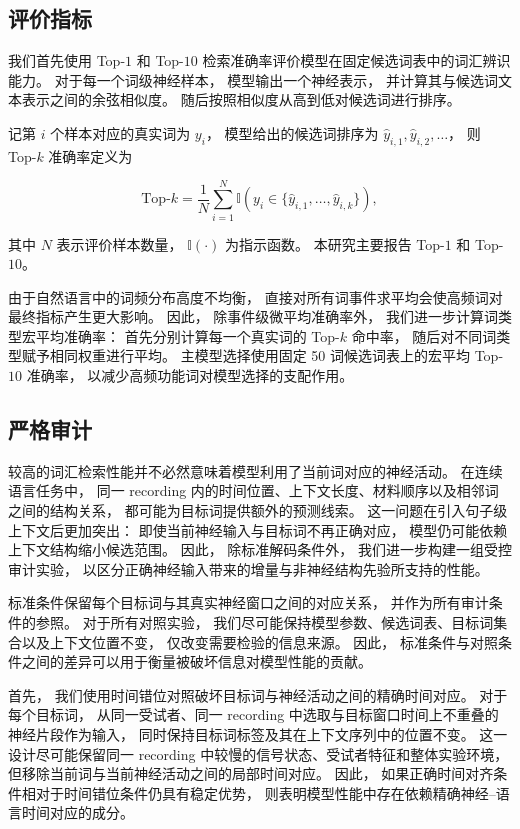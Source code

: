 \subsection{评价指标}

我们首先使用 Top-$1$ 和 Top-$10$ 检索准确率评价模型在固定候选词表中的词汇辨识能力。
对于每一个词级神经样本，
模型输出一个神经表示，
并计算其与候选词文本表示之间的余弦相似度。
随后按照相似度从高到低对候选词进行排序。

记第 $i$ 个样本对应的真实词为 $y_i$，
模型给出的候选词排序为
$\hat{y}_{i,1},\hat{y}_{i,2},\ldots$，
则 Top-$k$ 准确率定义为

\[
\mathrm{Top}\text{-}k
=
\frac{1}{N}
\sum_{i=1}^{N}
\mathbb{I}
\left(
y_i
\in
\{\hat{y}_{i,1},\ldots,\hat{y}_{i,k}\}
\right),
\]

其中 $N$ 表示评价样本数量，
$\mathbb{I}(\cdot)$ 为指示函数。
本研究主要报告 Top-$1$ 和 Top-$10$。

由于自然语言中的词频分布高度不均衡，
直接对所有词事件求平均会使高频词对最终指标产生更大影响。
因此，
除事件级微平均准确率外，
我们进一步计算词类型宏平均准确率：
首先分别计算每一个真实词的 Top-$k$ 命中率，
随后对不同词类型赋予相同权重进行平均。
主模型选择使用固定 50 词候选词表上的宏平均 Top-$10$ 准确率，
以减少高频功能词对模型选择的支配作用。

\subsection{严格审计}

较高的词汇检索性能并不必然意味着模型利用了当前词对应的神经活动。
在连续语言任务中，
同一 recording 内的时间位置、上下文长度、材料顺序以及相邻词之间的结构关系，
都可能为目标词提供额外的预测线索。
这一问题在引入句子级上下文后更加突出：
即使当前神经输入与目标词不再正确对应，
模型仍可能依赖上下文结构缩小候选范围。
因此，
除标准解码条件外，
我们进一步构建一组受控审计实验，
以区分正确神经输入带来的增量与非神经结构先验所支持的性能。

标准条件保留每个目标词与其真实神经窗口之间的对应关系，
并作为所有审计条件的参照。
对于所有对照实验，
我们尽可能保持模型参数、候选词表、目标词集合以及上下文位置不变，
仅改变需要检验的信息来源。
因此，
标准条件与对照条件之间的差异可以用于衡量被破坏信息对模型性能的贡献。

首先，
我们使用时间错位对照破坏目标词与神经活动之间的精确时间对应。
对于每个目标词，
从同一受试者、同一 recording 中选取与目标窗口时间上不重叠的神经片段作为输入，
同时保持目标词标签及其在上下文序列中的位置不变。
这一设计尽可能保留同一 recording 中较慢的信号状态、受试者特征和整体实验环境，
但移除当前词与当前神经活动之间的局部时间对应。
因此，
如果正确时间对齐条件相对于时间错位条件仍具有稳定优势，
则表明模型性能中存在依赖精确神经--语言时间对应的成分。

